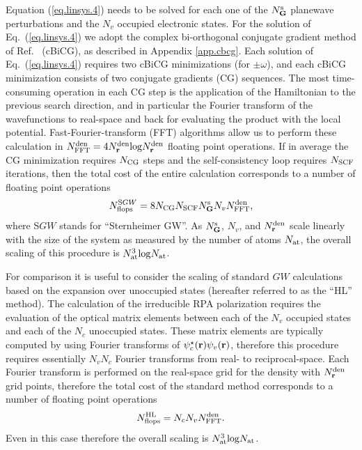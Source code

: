 \documentclass[twocolumn,prb,showpacs,superscriptaddress]{revtex4}
\def\w{\omega}
\def\G{{\bf G}}
\def\r{{\bf r}}
\begin{document}
Equation (\ref{eq.linsys.4}) needs to be solved for each one of the $N_\G^{\rm s}$ planewave perturbations
and the $N_v$ occupied electronic states. For the solution
of Eq.~(\ref{eq.linsys.4}) we adopt the complex bi-orthogonal conjugate gradient method
of Ref.~ (cBiCG), as described in Appendix \ref{app.cbcg}.
Each solution of Eq.\ (\ref{eq.linsys.4}) requires two cBiCG minimizations
(for $\pm\w$), and each cBiCG minimization consists of two conjugate gradients (CG) sequences.
The most time-consuming operation in each CG step is the application of the Hamiltonian 
to the previous search direction, and in particular
the Fourier transform of the wavefunctions to real-space and back for evaluating
the product with the local potential. Fast-Fourier-transform (FFT)
algorithms allow us to perform these calculation in $N^{\rm den}_{\rm FFT} = 4 N_\r^{\rm den} {\rm log} N_\r^{\rm den}$ floating point
operations.\cite{frigo}
If in average the CG minimization requires $N_{\rm CG}$ steps
and the self-consistency loop requires $N_{\rm SCF}$ iterations,
then the total cost of the entire calculation corresponds to a number of floating point operations
   \begin{equation}\label{eq.scaling.1}
   N^{{\rm S}GW}_{\rm flops} = 8 N_{\rm CG} N_{\rm SCF} N_\G^{\rm s}  N_v N^{\rm den}_{\rm FFT},
   \end{equation}
where S$GW$ stands for ``Sternheimer GW''.
As $N_\G^{\rm s}$, $N_v$, and $N_\r^{\rm den}$ scale linearly with the size of the system
as measured by the number of atoms $N_{\rm at}$,
the overall scaling of this procedure is $N_{\rm at}^3 {\rm log} N_{\rm at}$.

For comparison it is useful to consider the scaling of standard $GW$ calculations
based on the expansion over unoccupied states (hereafter referred to as the ``HL'' method).\cite{hl86} 
The calculation of the irreducible RPA polarization requires the evaluation of the 
optical matrix elements between each of the $N_v$ occupied states and each of the $N_c$ unoccupied states.
These matrix elements are typically computed by using Fourier transforms of $\psi_c^\star(\r)\psi_v(\r)$,
therefore this procedure requires essentially $N_v N_c$ Fourier transforms from real- to reciprocal-space.
Each Fourier transform is performed on the real-space grid for the density with $N_\r^{\rm den}$ grid points, 
therefore the total cost of the standard method corresponds to a number of floating point operations
   \begin{equation}\label{eq.scaling.2}
   N^{\rm HL}_{\rm flops} = N_c  N_v N^{\rm den}_{\rm FFT}.
   \end{equation}
Even in this case therefore the overall scaling is $N_{\rm at}^3 {\rm log} N_{\rm at}$.
\end{document}
